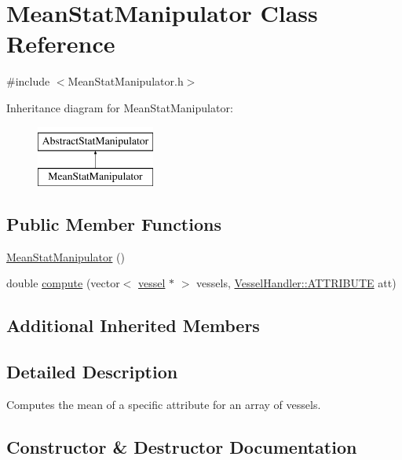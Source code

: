 \hypertarget{class_mean_stat_manipulator}{}\section{Mean\+Stat\+Manipulator Class Reference}
\label{class_mean_stat_manipulator}


{\ttfamily \#include $<$Mean\+Stat\+Manipulator.\+h$>$}

Inheritance diagram for Mean\+Stat\+Manipulator\+:\begin{figure}[H]
\begin{center}
\leavevmode
\includegraphics[height=2.000000cm]{d1/d8b/class_mean_stat_manipulator}
\end{center}
\end{figure}
\subsection*{Public Member Functions}
\begin{DoxyCompactItemize}
\item 
\hyperlink{class_mean_stat_manipulator_a9be1ad0a1ca9755c249ec11ca7f3f061}{Mean\+Stat\+Manipulator} ()
\item 
double \hyperlink{class_mean_stat_manipulator_ac5bfefb995b01bf06e39a694be3c0595}{compute} (vector$<$ \hyperlink{structvessel}{vessel} $\ast$ $>$ vessels, \hyperlink{class_vessel_handler_a6cc775e9a5bcbe69ef381f56b52982e7}{Vessel\+Handler\+::\+A\+T\+T\+R\+I\+B\+U\+TE} att)
\end{DoxyCompactItemize}
\subsection*{Additional Inherited Members}


\subsection{Detailed Description}
Computes the mean of a specific attribute for an array of vessels. 

\subsection{Constructor \& Destructor Documentation}
